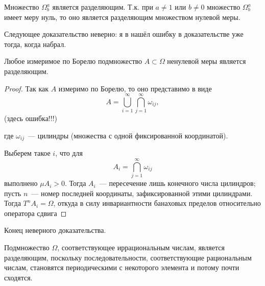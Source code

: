 \begin{corollary}
	Множество $\Omega^a_b$ является разделяющим.
	Т.к. при $a\neq 1$ или $b\neq 0$ множество $\Omega^a_b$ имеет меру нуль,
	то оно является разделяющим множеством нулевой меры.
\end{corollary}


Следующее доказательство неверно: я в нашёл ошибку в доказательстве уже тогда, когда набрал.

\begin{theorem}
	Любое измеримое по Борелю подмножество $A\subset \Omega$ ненулевой меры является разделяющим.
\end{theorem}

\begin{proof}
	Так как $A$ измеримо по Борелю, то оно представимо в виде
	\begin{equation}
		A = \bigcup_{i=1}^\infty  \bigcap_{j=1}^\infty \omega_{ij}
		,
	\end{equation}
	(здесь ошибка!!!)

	где $\omega_{ij}$~--- цилиндры (множества с одной фиксированной координатой).

	Выберем такое $i$, что для
	\begin{equation}
		A_i = \bigcap_{j=1}^\infty \omega_{ij}
	\end{equation}
	выполнено $\mu A_i > 0$.
	Тогда $A_i$~--- пересечение лишь конечного числа цилиндров;
	пусть $n$~--- номер последней координаты, зафиксированной этими цилиндрами.
	Тогда $T^n A_i = \Omega$,
	откуда в силу инвариантности банаховых пределов относительно оператора сдвига
\end{proof}

Конец неверного доказательства.

\begin{remark}
	Подмножество $\Omega$, соответствующее иррациональным числам, является разделяющим,
	поскольку последовательности, соответствующие рациональным числам,
	становятся периодическими с некоторого элемента и потому почти сходятся.
\end{remark}

